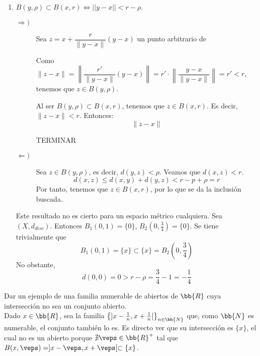\begin{ejercicio}
\begin{enumerate}
        
        \item $B(y,\rho)\subset B(x,r) \Longleftrightarrow ||y-x|| <r-\rho$. \label{Ej:Tema2_2.2}\\

        \begin{description}
            \item[$\Longrightarrow)$] Sea $z=x+\dfrac{r}{\|y-x\|}(y-x)$ un punto arbitrario de

            Como $\|z-x\|=\left\|\dfrac{r'}{\|y-x\|}(y-x)\right\| = r'\cdot \left\|\dfrac{y-x}{\|y-x\|}\right\|=r'<r$, tenemos que $z\in B(y,\rho)$.

            Al ser $B(y,\rho)\subset B(x,r)$, tenemos que $z\in B(x,r)$. Es decir, $\|z-x\|<r$. Entonces:
            \begin{equation*}
                \|z-x\|
            \end{equation*}

            TERMINAR

            \item[$\Longleftarrow)$] Sea $z\in B(y,\rho)$, es decir, $d(y,z)<\rho$. Veamos que $d(x,z)<r$.
            \begin{equation*}
                d(x,z)\leq d(x,y)+d(y,z) < r-p + \rho = r
            \end{equation*}
            Por tanto, tenemos que $z\in B(x,r)$, por lo que se da la inclusión buscada.
        \end{description}

        Este resultado no es cierto para un espacio métrico cualquiera. Sea $(X,d_{disc})$. Entonces $B_1\left(0,1\right)=\{0\}$, $B_2\left(0, \frac{3}{4}\right)=\{0\}$. Se tiene trivialmente que $$B_1(0,1)=\{x\}\subset\{x\}=B_2\left(0, \frac{3}{4}\right)$$
        No obstante,
        $$d(0,0)=0>r-\rho = \frac{3}{4}-1 = -\frac{1}{4}$$
    \end{enumerate}
\end{ejercicio}


\begin{ejercicio}
    Dar un ejemplo de una familia numerable de abiertos de $\bb{R}$ cuya intersección no sea un conjunto abierto.\\

    Dado $x\in \bb{R}$, sea la familia $\left\{]x-\frac{1}{n}, x+\frac{1}{n}[\right\}_{n\in \bb{N}}$ que, como $\bb{N}$ es numerable, el conjunto también lo es. Es directo ver que su intersección es $\{x\}$, el cual no es un abierto porque $\nexists \veps\in \bb{R}^+$ tal que $B(x,\veps)=]x-\veps, x+\veps[\subset \{x\}$.
\end{ejercicio}

